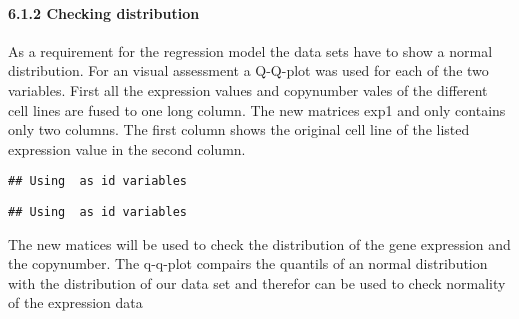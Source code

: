 \documentclass[]{article}
\newenvironment{Shaded}{\begin{snugshade}}{\end{snugshade}}
\newcommand{\CommentTok}[1]{\textcolor[rgb]{0.56,0.35,0.01}{\textit{#1}}}
\newcommand{\DataTypeTok}[1]{\textcolor[rgb]{0.13,0.29,0.53}{#1}}
\newcommand{\KeywordTok}[1]{\textcolor[rgb]{0.13,0.29,0.53}{\textbf{#1}}}
\newcommand{\NormalTok}[1]{#1}
\newcommand{\OperatorTok}[1]{\textcolor[rgb]{0.81,0.36,0.00}{\textbf{#1}}}
\newcommand{\StringTok}[1]{\textcolor[rgb]{0.31,0.60,0.02}{#1}}
\let\oldparagraph\paragraph
\renewcommand{\paragraph}[1]{\oldparagraph{#1}\mbox{}}
\begin{document}
\hypertarget{checking-distribution}{%
\paragraph{6.1.2 Checking distribution}\label{checking-distribution}}

As a requirement for the regression model the data sets have to show a
normal distribution. For an visual assessment a Q-Q-plot was used for
each of the two variables. First all the expression values and
copynumber vales of the different cell lines are fused to one long
column. The new matrices exp1 and only contains only two columns. The
first column shows the original cell line of the listed expression value
in the second column.

\begin{Shaded}
\end{Shaded}

\begin{verbatim}
## Using  as id variables
\end{verbatim}

\begin{Shaded}
\end{Shaded}

\begin{verbatim}
## Using  as id variables
\end{verbatim}

The new matices will be used to check the distribution of the gene
expression and the copynumber. The q-q-plot compairs the quantils of an
normal distribution with the distribution of our data set and therefor
can be used to check normality of the expression data
\end{document}
